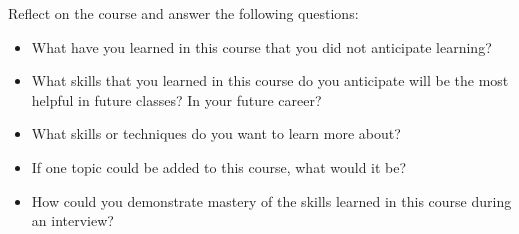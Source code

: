 \documentclass[10pt]{article}
\begin{document}
Reflect on the course and answer the following questions:
\begin{itemize}
    \item What have you learned in this course that you did not anticipate learning? 
    \item What skills that you learned in this course do you anticipate will be the most helpful in future classes? In your future career? 
    \item What skills or techniques do you want to learn more about? 
    \item If one topic could be added to this course, what would it be? 
    \item How could you demonstrate mastery of the skills learned in this course during an interview? 
\end{itemize}
\end{document}
